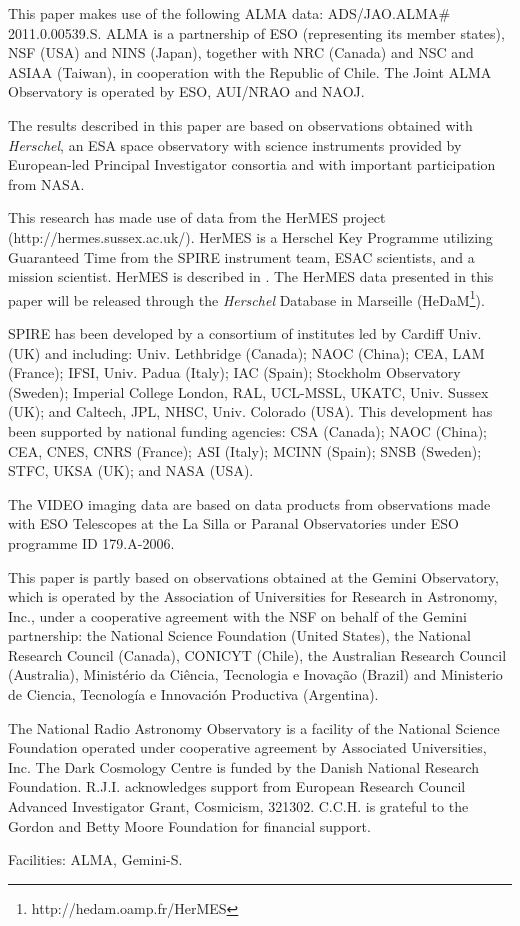 \documentclass[iop]{emulateapj}
\begin{document}
\begin{acknowledgments}

This paper makes use of the following ALMA data: ADS/JAO.ALMA\# 2011.0.00539.S.
ALMA is a partnership of ESO (representing its member states), NSF (USA) and
NINS (Japan), together with NRC (Canada) and NSC and ASIAA (Taiwan), in
cooperation with the Republic of Chile. The Joint ALMA Observatory is operated
by ESO, AUI/NRAO and NAOJ.

The results described in this paper are based on observations obtained with
{\it Herschel}, an ESA space observatory with science instruments provided by
European-led Principal Investigator consortia and with important participation
from NASA.  

This research has made use of data from the HerMES project
(http://hermes.sussex.ac.uk/). HerMES is a Herschel Key Programme utilizing
Guaranteed Time from the SPIRE instrument team, ESAC scientists, and a mission
scientist. HerMES is described in \citet{Oliver:2012lr}.  The HerMES data
presented in this paper will be released through the {\em Herschel} Database in
Marseille (HeDaM\footnote{http://hedam.oamp.fr/HerMES}).

SPIRE has been developed by a consortium of institutes led by Cardiff Univ.
(UK) and including: Univ. Lethbridge (Canada); NAOC (China); CEA, LAM (France);
IFSI, Univ. Padua (Italy); IAC (Spain); Stockholm Observatory (Sweden);
Imperial College London, RAL, UCL-MSSL, UKATC, Univ. Sussex (UK); and Caltech,
JPL, NHSC, Univ. Colorado (USA). This development has been supported by
national funding agencies: CSA (Canada); NAOC (China); CEA, CNES, CNRS
(France); ASI (Italy); MCINN (Spain); SNSB (Sweden); STFC, UKSA (UK); and NASA
(USA).

The VIDEO imaging data are based on data products from observations
made with ESO Telescopes at the La Silla or Paranal Observatories under ESO
programme ID 179.A-2006.

This paper is partly based on observations obtained at the Gemini Observatory,
which is operated by the Association of Universities for Research in Astronomy,
Inc., under a cooperative agreement with the NSF on behalf of the Gemini
partnership: the National Science Foundation (United States), the National
Research Council (Canada), CONICYT (Chile), the Australian Research Council
(Australia), Minist\'erio da Ci\^encia, Tecnologia e Inova\c{c}\~ao (Brazil)
and Ministerio de Ciencia, Tecnolog\'ia e Innovaci\'on Productiva (Argentina).  

The National Radio Astronomy Observatory is a facility of the National Science
Foundation operated under cooperative agreement by Associated Universities,
Inc.  The Dark Cosmology Centre is funded by the Danish National Research
Foundation. R.J.I. acknowledges support from European Research Council Advanced
Investigator Grant, Cosmicism, 321302. C.C.H. is grateful to the Gordon and
Betty Moore Foundation for financial support.



Facilities: ALMA, Gemini-S.

\end{acknowledgments}
\end{document}

